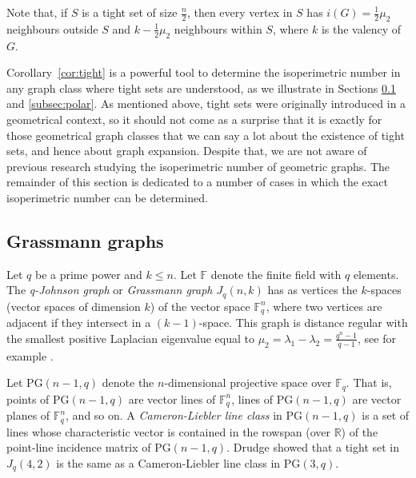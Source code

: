 \documentclass[a4paper,11pt]{article}
\theoremstyle{definition}
\begin{document}
Note that, if $S$ is a tight set of size $\frac{n}{2}$, then every vertex in $S$ has \(i(G)=\frac12\mu_2\) neighbours outside $S$ and \(k-\frac12\mu_2\) neighbours within $S$, where $k$ is the valency of $G$.


Corollary~\ref{cor:tight} is a powerful tool to determine the isoperimetric number in any graph class where tight sets are understood, as we illustrate in Sections \ref{sec:grassman} and \ref{subsec:polar}. As mentioned above, tight sets were originally introduced in a geometrical context, so it should not come as a surprise that it is exactly for those geometrical graph classes that we can say a lot about the existence of tight sets, and hence about graph expansion. Despite that, we are not aware of previous research studying the isoperimetric number of geometric graphs. The remainder of this section is dedicated to a number of cases in which the exact isoperimetric number can be determined.


\subsection{Grassmann graphs}\label{sec:grassman}

Let \(q\) be a prime power and \(k\leq n\). Let \(\mathbb{F}\) denote the finite field with \(q\) elements. The \emph{q-Johnson graph} or \emph{Grassmann graph $J_q(n,k)$} has as vertices the \(k\)-spaces (vector spaces of dimension \(k\)) of the vector space $\mathbb{F}_q^n$, where two vertices are adjacent if they intersect in a \((k-1)\)-space. This graph is distance regular with the smallest positive Laplacian eigenvalue equal to $\mu_2=\lambda_1-\lambda_2=\frac{q^n-1}{q-1}$, see for example \cite{boolean1}.

Let \(\mathrm{PG}(n-1,q)\) denote the \(n\)-dimensional projective space over \(\mathbb{F}_q\). That is, points of \(\mathrm{PG}(n-1,q)\) are vector lines of \(\mathbb{F}_q^n\), lines of \(\mathrm{PG}(n-1,q)\) are vector planes of \(\mathbb{F}_q^n\), and so on.
A \emph{Cameron-Liebler line class} in \(\mathrm{PG}(n-1,q)\) is a set of lines whose characteristic vector is contained in the rowspan (over \(\mathbb{R}\)) of the point-line incidence matrix of \(\mathrm{PG}(n-1,q)\).
Drudge \cite{Drudge} showed that a tight set in \(J_q(4,2)\) is the same as a Cameron-Liebler line class in PG\((3,q)\).
\end{document}
